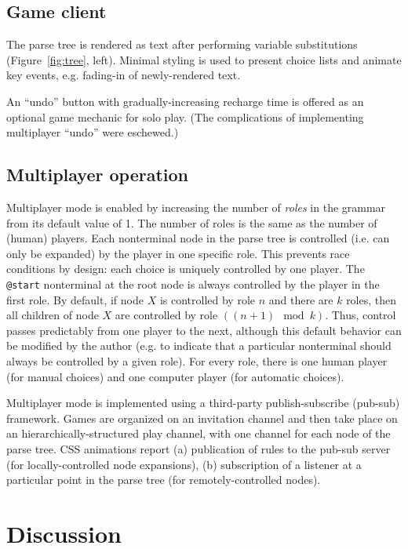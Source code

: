 \documentclass{acm_proc_article-sp}
\begin{document}
\subsection{Game client}

The parse tree is rendered as text after performing variable substitutions (Figure~\ref{fig:tree}, left).
Minimal styling is used to present choice lists and animate key events,
e.g. fading-in of newly-rendered text.

An ``undo'' button with gradually-increasing recharge time is offered as an optional game mechanic for solo play.
(The complications of implementing multiplayer ``undo'' were eschewed.)

\subsection{Multiplayer operation}

Multiplayer mode is enabled by increasing the number of {\em roles} in the grammar from its default value of 1.
The number of roles is the same as the number of (human) players.
Each nonterminal node in the parse tree is controlled (i.e. can only be expanded) by the player in one specific role.
This prevents race conditions by design: each choice is uniquely controlled by one player.
The {\tt @start} nonterminal at the root node is always controlled by the player in the first role.
By default, if node $X$ is controlled by role $n$ and there are $k$ roles,
then all children of node $X$ are controlled by role $((n+1)\mod k)$.
Thus, control passes predictably from one player to the next,
although this default behavior can be modified by the author (e.g. to indicate that a particular nonterminal
should always be controlled by a given role).
For every role, there is one human player (for manual choices)
and one computer player (for automatic choices).

Multiplayer mode is implemented using a third-party publish-subscribe (pub-sub) framework.
Games are organized on an invitation channel and then take place on an hierarchically-structured
play channel, with one channel for each node of the parse tree.
CSS animations report
 (a) publication of rules to the pub-sub server (for locally-controlled node expansions),
 (b) subscription of a listener at a particular point in the parse tree (for remotely-controlled nodes).

\section{Discussion}
\end{document}
